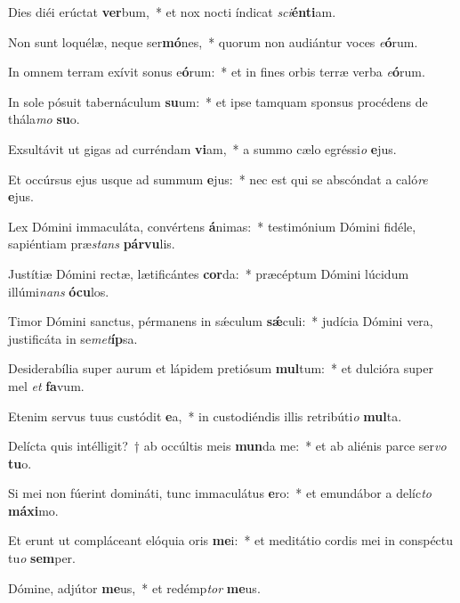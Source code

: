 \item Dies diéi erúctat \textbf{ver}bum,~* et nox nocti índicat \textit{sci}\textbf{én}\textbf{ti}am.
\item Non sunt loquélæ, neque ser\textbf{mó}nes,~* quorum non audiántur voces \textit{e}\textbf{ó}rum.
\item In omnem terram exívit sonus e\textbf{ó}rum:~* et in fines orbis terræ verba \textit{e}\textbf{ó}rum.
\item In sole pósuit tabernáculum \textbf{su}um:~* et ipse tamquam sponsus procédens de thála\textit{mo} \textbf{su}o.
\item Exsultávit ut gigas ad curréndam \textbf{vi}am,~* a summo cælo egréssi\textit{o} \textbf{e}jus.
\item Et occúrsus ejus usque ad summum \textbf{e}jus:~* nec est qui se abscóndat a caló\textit{re} \textbf{e}jus.
\item Lex Dómini immaculáta, convértens \textbf{á}nimas:~* testimónium Dómini fidéle, sapiéntiam præ\textit{stans} \textbf{pár}\textbf{vu}lis.
\item Justítiæ Dómini rectæ, lætificántes \textbf{cor}da:~* præcéptum Dómini lúcidum illúmi\textit{nans} \textbf{ó}\textbf{cu}los.
\item Timor Dómini sanctus, pérmanens in sǽculum \textbf{sǽ}culi:~* judícia Dómini vera, justificáta in se\textit{met}\textbf{íp}sa.
\item Desiderabília super aurum et lápidem pretiósum \textbf{mul}tum:~* et dulcióra super mel \textit{et} \textbf{fa}vum.
\item Etenim servus tuus custódit \textbf{e}a,~* in custodiéndis illis retribúti\textit{o} \textbf{mul}ta.
\item Delícta quis intélligit?~† ab occúltis meis \textbf{mun}da me:~* et ab aliénis parce ser\textit{vo} \textbf{tu}o.
\item Si mei non fúerint domináti, tunc immaculátus \textbf{e}ro:~* et emundábor a delíc\textit{to} \textbf{má}\textbf{xi}mo.
\item Et erunt ut compláceant elóquia oris \textbf{me}i:~* et meditátio cordis mei in conspéctu tu\textit{o} \textbf{sem}per.
\item Dómine, adjútor \textbf{me}us,~* et redémp\textit{tor} \textbf{me}us.
